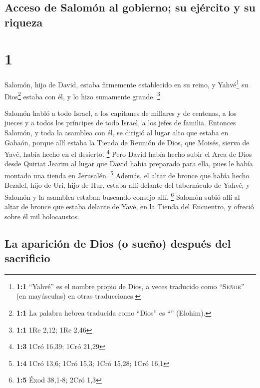 \hypertarget{acceso-de-salomuxf3n-al-gobierno-su-ejuxe9rcito-y-su-riqueza}{%
\subsection{Acceso de Salomón al gobierno; su ejército y su
riqueza}\label{acceso-de-salomuxf3n-al-gobierno-su-ejuxe9rcito-y-su-riqueza}}

\hypertarget{section}{%
\section{1}\label{section}}

 Salomón, hijo de David, estaba firmemente establecido en
su reino, y Yahvé\footnote{\textbf{1:1} ``Yahvé'' es el nombre propio de
  Dios, a veces traducido como ``\textsc{Señor}'' (en mayúsculas) en
  otras traducciones.} su Dios\footnote{\textbf{1:1} La palabra hebrea
  traducida como ``Dios'' es ``'' (Elohim).} estaba con
él, y lo hizo sumamente grande. \footnote{\textbf{1:1} 1Re 2,12; 1Re
  2,46}

 Salomón habló a todo Israel, a los capitanes de millares
y de centenas, a los jueces y a todos los príncipes de todo Israel, a
los jefes de familia.  Entonces Salomón, y toda la
asamblea con él, se dirigió al lugar alto que estaba en Gabaón, porque
allí estaba la Tienda de Reunión de Dios, que Moisés, siervo de Yavé,
había hecho en el desierto. \footnote{\textbf{1:3} 1Cró 16,39; 1Cró
  21,29}  Pero David había hecho subir el Arca de Dios
desde Quiriat Jearim al lugar que David había preparado para ella, pues
le había montado una tienda en Jerusalén. \footnote{\textbf{1:4} 1Cró
  13,6; 1Cró 15,3; 1Cró 15,28; 1Cró 16,1}  Además, el
altar de bronce que había hecho Bezalel, hijo de Uri, hijo de Hur,
estaba allí delante del tabernáculo de Yahvé, y Salomón y la asamblea
estaban buscando consejo allí. \footnote{\textbf{1:5} Éxod 38,1-8; 2Cró
  1,3}  Salomón subió allí al altar de bronce que estaba
delante de Yavé, en la Tienda del Encuentro, y ofreció sobre él mil
holocaustos.

\hypertarget{la-apariciuxf3n-de-dios-o-sueuxf1o-despuuxe9s-del-sacrificio}{%
\subsection{La aparición de Dios (o sueño) después del
sacrificio}\label{la-apariciuxf3n-de-dios-o-sueuxf1o-despuuxe9s-del-sacrificio}}

